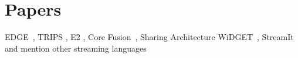 \documentclass[pageno]{jpaper}
\begin{document}


\section{Papers}

EDGE~\cite{edge_architecture,spdi}, TRIPS \cite{trips_cs}, E2
\cite{e2_arch}, Core Fusion~\cite{CoreFusion}, Sharing Architecture
\cite{sharing_arch} WiDGET~\cite{widget}, StreamIt \cite{stream_lang,
grid_streamit, machine_partitioning, empirical_stream_prog} and
mention other streaming languages~\cite{brook_gpu,wavescript_cmp}





\end{document}
